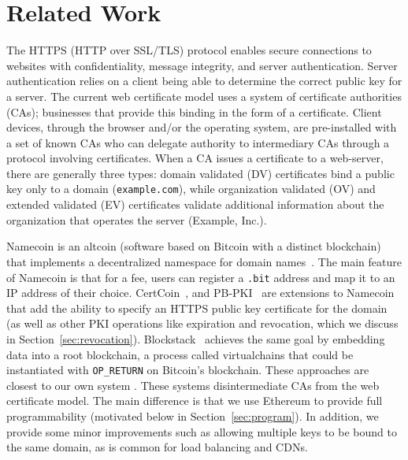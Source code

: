 
\section{Related Work}

The HTTPS (HTTP over SSL/TLS) protocol enables secure connections to websites with confidentiality, message integrity, and server authentication. Server authentication relies on a client being able to determine the correct public key for a server. The current web certificate model uses a system of certificate authorities (CAs); businesses that provide this binding in the form of a certificate. Client devices, through the browser and/or the operating system, are pre-installed with a set of known CAs who can delegate authority to intermediary CAs through a protocol involving certificates. When a CA issues a certificate to a web-server, there are generally three types: domain validated (DV) certificates bind a public key only to a domain (\eg \texttt{example.com}), while organization validated (OV) and extended validated (EV) certificates validate additional information about the organization that operates the server (Example, Inc.).

Namecoin is an altcoin (software based on Bitcoin with a distinct blockchain) that implements a decentralized namespace for domain names~\cite{Kalodner2015}. The main feature of Namecoin is that for a fee, users can register a \texttt{.bit} address and map it to an IP address of their choice.  CertCoin~\cite{fromknecht2014certcoin}, and PB-PKI~\cite{axon2016pb} are extensions to Namecoin that add the ability to specify an HTTPS public key certificate for the domain (as well as other PKI operations like expiration and revocation, which we discuss in Section~\ref{sec:revocation}). Blockstack~\cite{ali2016blockstack} achieves the same goal by embedding data into a root blockchain, a process called virtualchains that could be instantiated with \texttt{OP\_RETURN} on Bitcoin's blockchain. These approaches are closest to our own system \Ghazal. These systems disintermediate CAs from the web certificate model. The main difference is that we use Ethereum to provide full programmability (motivated below in Section~\ref{sec:program}). In addition, we provide some minor improvements such as allowing multiple keys to be bound to the same domain, as is common for load balancing and CDNs.

